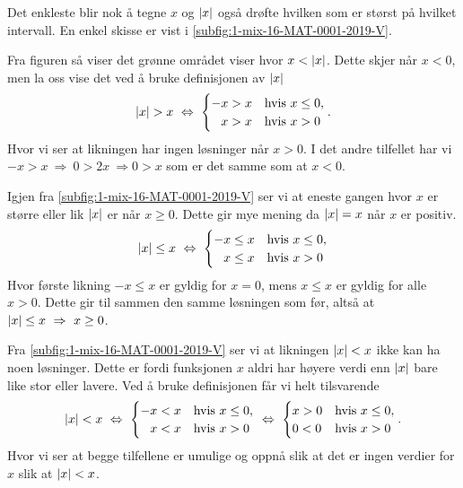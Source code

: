 \documentclass[a4paper,11pt]{article}
\begin{document}
\begin{solution}
  Det enkleste blir nok å tegne $x$ og $\lvert x\rvert$ også drøfte hvilken som
  er størst på hvilket intervall. En enkel skisse er vist i
  \cref{subfig:1-mix-16-MAT-0001-2019-V}. \medskip

   Fra figuren så
  viser det grønne området viser hvor $x<\lvert x\rvert$. Dette skjer når $x<0$,
  men la oss vise det ved å bruke definisjonen av $\lvert x\rvert$ 
  \begin{equation*}
    \abs{x}>x \ \Leftrightarrow \ 
    \begin{cases}
      -x>x & \text{hvis} \ x \leq 0, \\
      \phantom{-} x>x & \text{hvis} \ x > 0
    \end{cases}.
  \end{equation*}        
  Hvor vi ser at likningen har ingen løsninger når $x>0$. I det andre
  tilfellet har vi $-x > x \ \Rightarrow \ 0 > 2x \ \Rightarrow 0 > x$ som
  er det samme som at $x < 0$.
  \medskip

   Igjen fra
  \cref{subfig:1-mix-16-MAT-0001-2019-V} ser vi at eneste gangen hvor $x$
  er større eller lik $\lvert x\rvert$ er når $x\geq 0$. Dette gir mye mening da
  $\lvert x\rvert = x$ når $x$ er positiv. 
  \begin{equation*}
    \abs{x} \leq x \ \Leftrightarrow \ 
    \begin{cases}
      -x \leq x & \text{hvis} \ x \leq 0, \\
      \phantom{-} x \leq x & \text{hvis} \ x > 0
    \end{cases}
  \end{equation*}        
  Hvor første likning $-x \leq x$ er gyldig for $x = 0$, mens $x \leq x$
  er gyldig for alle $x>0$. Dette gir til sammen den samme løsningen som
  før, altså at $\lvert x\rvert \leq x \ \Rightarrow \ x \geq 0$.
  \medskip

   Fra
  \cref{subfig:1-mix-16-MAT-0001-2019-V} ser vi at likningen $\lvert x\rvert < x$
  ikke kan ha noen løsninger. Dette er fordi funksjonen $x$ aldri har
  høyere verdi enn $\lvert x\rvert$ bare like stor eller lavere. Ved å bruke
  definisjonen får vi helt tilsvarende
  \begin{equation*}
    \abs{x} < x \ \Leftrightarrow \ 
    \begin{cases}
      -x < x & \text{hvis} \ x \leq 0, \\
      \phantom{-} x < x & \text{hvis} \ x > 0
    \end{cases}
    \ \Leftrightarrow \ 
    \begin{cases}
      x > 0 & \text{hvis} \ x \leq 0, \\
      0 < 0 & \text{hvis} \ x > 0
    \end{cases}.
  \end{equation*}        
  Hvor vi ser at begge tilfellene er umulige og oppnå slik at det er
  ingen verdier for $x$ slik at $\lvert x\rvert < x$.
\end{solution}
\end{document}
